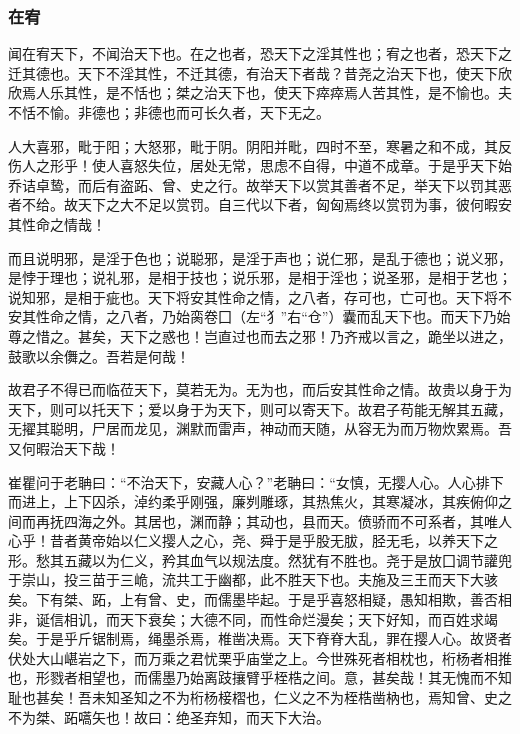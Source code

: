 \documentclass[]{article}
\begin{document}
\hypertarget{header-n215}{%
\subsubsection{在宥}\label{header-n215}}

闻在宥天下，不闻治天下也。在之也者，恐天下之淫其性也；宥之也者，恐天下之迁其德也。天下不淫其性，不迁其德，有治天下者哉？昔尧之治天下也，使天下欣欣焉人乐其性，是不恬也；桀之治天下也，使天下瘁瘁焉人苦其性，是不愉也。夫不恬不愉。非德也；非德也而可长久者，天下无之。

人大喜邪，毗于阳；大怒邪，毗于阴。阴阳并毗，四时不至，寒暑之和不成，其反伤人之形乎！使人喜怒失位，居处无常，思虑不自得，中道不成章。于是乎天下始乔诘卓鸷，而后有盗跖、曾、史之行。故举天下以赏其善者不足，举天下以罚其恶者不给。故天下之大不足以赏罚。自三代以下者，匈匈焉终以赏罚为事，彼何暇安其性命之情哉！

而且说明邪，是淫于色也；说聪邪，是淫于声也；说仁邪，是乱于德也；说义邪，是悖于理也；说礼邪，是相于技也；说乐邪，是相于淫也；说圣邪，是相于艺也；说知邪，是相于疵也。天下将安其性命之情，之八者，存可也，亡可也。天下将不安其性命之情，之八者，乃始脔卷囗（左``犭''右``仓''）囊而乱天下也。而天下乃始尊之惜之。甚矣，天下之惑也！岂直过也而去之邪！乃齐戒以言之，跪坐以进之，鼓歌以余儛之。吾若是何哉！

故君子不得已而临莅天下，莫若无为。无为也，而后安其性命之情。故贵以身于为天下，则可以托天下；爱以身于为天下，则可以寄天下。故君子苟能无解其五藏，无擢其聪明，尸居而龙见，渊默而雷声，神动而天随，从容无为而万物炊累焉。吾又何暇治天下哉！

崔瞿问于老聃曰：``不治天下，安藏人心？''老聃曰：``女慎，无撄人心。人心排下而进上，上下囚杀，淖约柔乎刚强，廉刿雕琢，其热焦火，其寒凝冰，其疾俯仰之间而再抚四海之外。其居也，渊而静；其动也，县而天。偾骄而不可系者，其唯人心乎！昔者黄帝始以仁义撄人之心，尧、舜于是乎股无胈，胫无毛，以养天下之形。愁其五藏以为仁义，矜其血气以规法度。然犹有不胜也。尧于是放囗调节讙兜于崇山，投三苗于三峗，流共工于幽都，此不胜天下也。夫施及三王而天下大骇矣。下有桀、跖，上有曾、史，而儒墨毕起。于是乎喜怒相疑，愚知相欺，善否相非，诞信相讥，而天下衰矣；大德不同，而性命烂漫矣；天下好知，而百姓求竭矣。于是乎斤锯制焉，绳墨杀焉，椎凿决焉。天下脊脊大乱，罪在撄人心。故贤者伏处大山嵁岩之下，而万乘之君忧栗乎庙堂之上。今世殊死者相枕也，桁杨者相推也，形戮者相望也，而儒墨乃始离跂攘臂乎桎梏之间。意，甚矣哉！其无愧而不知耻也甚矣！吾未知圣知之不为桁杨椄槢也，仁义之不为桎梏凿枘也，焉知曾、史之不为桀、跖嚆矢也！故曰：绝圣弃知，而天下大治。
\end{document}
